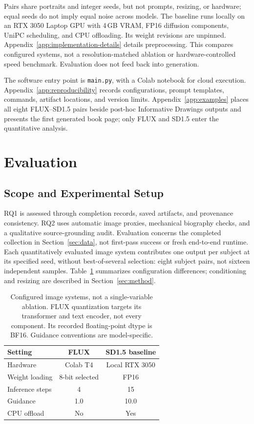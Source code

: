 \documentclass[11pt]{article}
\begin{document}
Pairs share portraits and integer seeds, but not prompts, resizing, or hardware; equal seeds do not imply equal noise across models. The baseline runs locally on an RTX 3050 Laptop GPU with 4\,GB VRAM, FP16 diffusion components, UniPC scheduling, and CPU offloading. Its weight revisions are unpinned. Appendix~\ref{app:implementation-details} details preprocessing. This compares configured systems, not a resolution-matched ablation or hardware-controlled speed benchmark. Evaluation does not feed back into generation.

The software entry point is \nolinkurl{main.py}, with a Colab notebook for cloud execution. Appendix~\ref{app:reproducibility} records configurations, prompt templates, commands, artifact locations, and version limits. Appendix~\ref{app:examples} places all eight FLUX--SD1.5 pairs beside post-hoc Informative Drawings outputs and presents the first generated book page; only FLUX and SD1.5 enter the quantitative analysis.

\section{Evaluation}
\label{sec:evaluation}

\subsection{Scope and Experimental Setup}

RQ1 is assessed through completion records, saved artifacts, and provenance consistency. RQ2 uses automatic image proxies, mechanical biography checks, and a qualitative source-grounding audit. Evaluation concerns the completed collection in Section~\ref{sec:data}, not first-pass success or fresh end-to-end runtime. Each quantitatively evaluated image system contributes one output per subject at its specified seed, without best-of-several selection: eight subject pairs, not sixteen independent samples. Table~\ref{tab:image-settings} summarizes configuration differences; conditioning and resizing are described in Section~\ref{sec:method}.

\begin{table}[t]
\centering
\small
\begin{tabular}{@{}lcc@{}}
\hline
Setting & FLUX & SD1.5 baseline \\
\hline
Hardware & Colab T4 & Local RTX 3050 \\
Weight loading & 8-bit selected & FP16 \\
Inference steps & 4 & 15 \\
Guidance & 1.0 & 10.0 \\
CPU offload & No & Yes \\
\hline
\end{tabular}
\caption{Configured image systems, not a single-variable ablation. FLUX quantization targets its transformer and text encoder, not every component. Its recorded floating-point dtype is BF16. Guidance conventions are model-specific.}
\label{tab:image-settings}
\end{table}
\end{document}
